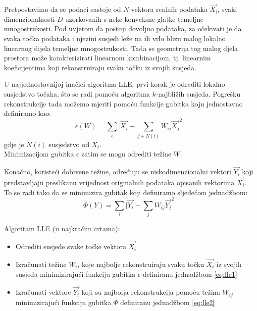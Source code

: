 \documentclass[times, utf8, diplomski]{fer}
\begin{document}
Pretpostavimo da se podaci sastoje od $N$ vektora realnih podataka $\vec{X_i}$, svaki dimenzionalnosti $D$ uzorkovanih s neke konveksne glatke temeljne mnogostrukosti. Pod uvjetom da postoji dovoljno podataka, za očekivati je da svaka točka podataka i njezini susjedi leže na ili vrlo blizu malog lokalno linearnog dijela temeljne mnogostrukosti. Tada se geometrija tog malog djela prostora može karakterizirati linearnom kombinacijom, tj. linearnim koeficijentima koji rekonstruiraju svaku točku iz svojih susjeda.

U najjednostavnijoj inačici algoritma LLE, prvi korak je odrediti lokalno susjedstvo točaka, što se radi pomoću algoritma $k$-najbližih susjeda. Pogrešku rekonstrukcije tada možemo mjeriti pomoću funkcije gubitka koju jednostavno definiramo kao:
\begin{equation}
    \epsilon(W) = \sum_i \vert{\vec{X_i} - \sum_{j \in N(i)} W_{ij} \vec{X_j}}^2
    \label{eq:lle1}
\end{equation}
gdje je $N(i)$ susjedstvo od $X_i$.\\
Minimizacijom gubitka $\epsilon$ zatim se mogu odrediti težine $W$.

Konačno, koristeći dobivene težine, određuju se niskodimenzionalni vektori $\vec{Y_i}$ koji predstavljaju preslikanu vrijednost originalnih podataka opisanih vektorima $\vec{X_i}$. To se radi tako da se minimizira gubitak koji definiramo sljedećom jednadžbom:
\begin{equation}
    \Phi(Y) = \sum_i \vert{\vec{Y_i} - \sum_{j} W_{ij} \vec{Y_j}}^2
    \label{eq:lle2}
\end{equation}

Algoritam LLE (u najkraćim crtama):
\begin{itemize}
    \item Odrediti susjede svake točke vektora $\vec{X_i}$
    \item Izračunati težine $W_{ij}$ koje najbolje rekonstruiraju svaku točku $\vec{X_i}$ iz svojih susjeda minimizirajući funkciju gubitka $\epsilon$ definiranu jednadžbom \ref{eq:lle1}
    \item Izračunati vektore $\vec{Y_i}$ koji su najbolja rekonstrukcija pomoću težina $W_{ij}$ minimizirajući funkciju gubitka $\Phi$ definiranu jednadžbom \ref{eq:lle2}
\end{itemize}
\end{document}
